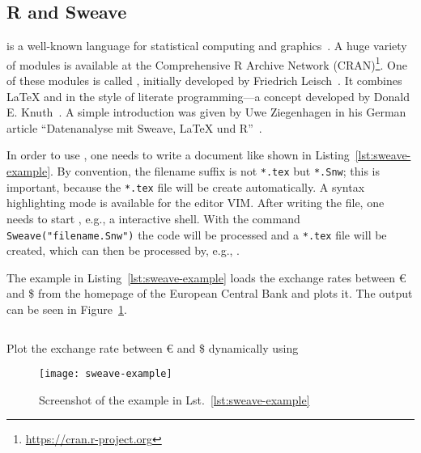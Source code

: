 \subsection{R and Sweave}

 is a well-known language for statistical computing and
graphics~\cite{Ihaka1998}.  A huge variety of modules is available at the
Comprehensive R Archive Network (CRAN)\footnote{%
  \href{https://cran.r-project.org}{https://cran.r-project.org}}.  One of these
modules is called , initially developed by Friedrich
Leisch~\cite{Leisch2002}.  It combines \LaTeX{} and  in the style of
literate programming—a concept developed by Donald E\@. Knuth~\cite{Knuth1992}.
A simple introduction was given by Uwe Ziegenhagen in his German article
\enquote{Datenanalyse mit Sweave, \LaTeX{} und R}~\cite{Ziegenhagen2010}.

In order to use , one needs to write a document like shown in
Listing~\ref{lst:sweave-example}.  By convention, the filename suffix is not
\texttt{*.tex} but \texttt{*.Snw}; this is important, because the \texttt{*.tex}
file will be create automatically.  A syntax highlighting mode is available for
the editor VIM\@.  After writing the file, one needs to start ,
e.g., a  interactive shell.  With the command
\texttt{Sweave("filename.Snw")} the  code will be processed
and a \texttt{*.tex} file will be created, which can then be processed by, e.g.,
.

The example in Listing~\ref{lst:sweave-example} loads the exchange rates between
\euro{} and \$ from the homepage of the European Central Bank and plots it. The
output can be seen in Figure~\ref{fig:sweave-example}.

\begin{listing}[H]
  \inputminted{latex}{../examples/sweave-example.Snw}
  \caption{Plot the exchange rate between \euro{} and \$ dynamically using
    }
  \label{lst:sweave-example}
\end{listing}
\begin{figure}[!t]
  \texttt{[image: sweave-example]}
  \caption{Screenshot of the  example in
    Lst.~\ref{lst:sweave-example}}
  \label{fig:sweave-example}
\end{figure}
